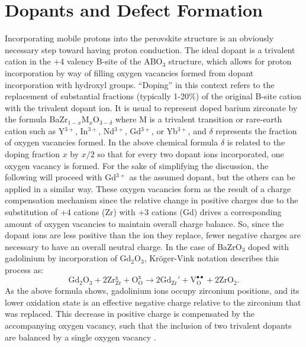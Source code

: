 \vspace{12pt}
\section{Dopants and Defect Formation}Incorporating mobile protons into the perovskite structure is an obviously necessary step toward having proton conduction. The ideal dopant is a trivalent cation in the +4 valency B-site of the ABO$_3$ structure, which allows for proton incorporation by way of filling oxygen vacancies formed from dopant incorporation with hydroxyl groups. ``Doping'' in this context refers to the replacement of substantial fractions (typically 1-20\%) of the original B-site cation with the trivalent dopant ion. It is usual to represent doped barium zirconate by the formula BaZr$_{1-x}$M$_x$O$_{3-\delta}$ where M is a trivalent transition or rare-earth cation such as Y$^{3+}$, In$^{3+}$, Nd$^{3+}$, Gd$^{3+}$, or Yb$^{3+}$, and $\delta$ represents the fraction of oxygen vacancies formed. In the above chemical formula $\delta$ is related to the doping fraction $x$ by $x/2$ so that for every two dopant ions incorporated, one oxygen vacancy is formed. For the sake of simplifying the discussion, the following will proceed with Gd$^{3+}$ as the assumed dopant, but the others can be applied in a similar way. These oxygen vacancies form as the result of a charge compensation mechanism since the relative change in positive charges due to the substitution of +4 cations (Zr) with +3 cations (Gd) drives a corresponding amount of oxygen vacancies to maintain overall charge balance. So, since the dopant ions are less positive than the ion they replace, fewer negative charges are necessary to have an overall neutral charge. In the case of BaZrO$_3$ doped with gadolinium by incorporation of Gd$_2$O$_3$, Kr\"oger-Vink notation \cite{Kroger1956} describes this process as:
\begin{equation}
\mathrm{Gd_2 O_3 + 2 Zr_{Zr}^x + O_O^x \rightarrow 2 Gd_{Zr}' + V_O^{\bullet\bullet} + 2 Zr O_2}.
\end{equation}
As the above formula shows, gadolinium ions occupy zirconium positions, and its lower oxidation state is an effective negative charge relative to the zirconium that was replaced. This decrease in positive charge is compensated by the accompanying oxygen vacancy, such that the inclusion of two trivalent dopants are balanced by a single oxygen vacancy \cite{Islam2000}. 

